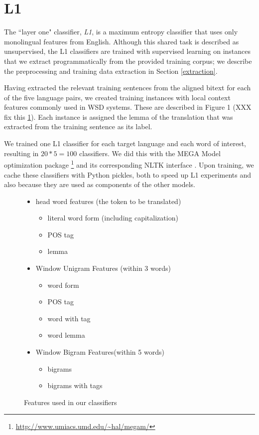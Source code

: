 \documentclass[11pt,letterpaper]{article}
\begin{document}
\section{L1}
The ``layer one" classifier, \emph{L1}, is a maximum entropy classifier that
uses only monolingual features from English. Although this shared task is
described as unsupervised, the L1 classifiers are trained with supervised
learning on instances that we extract programmatically from the provided
training corpus; we describe the preprocessing and training data extraction in
Section \ref{extraction}.

Having extracted the relevant training sentences from the aligned bitext for
each of the five language pairs, we created training instances with local
context features commonly used in WSD systems. These are described in Figure 1
(XXX fix this \ref{fig:features}). Each instance is assigned the lemma of the
translation that was extracted from the training sentence as its
label.

We trained one L1 classifier for each target language and each word of
interest, resulting in $20*5 = 100$ classifiers. We did this with the MEGA
Model optimization package \cite{daume04cg-bfgs}
\footnote{\url{http://www.umiacs.umd.edu/~hal/megam/}} and its corresponding
NLTK interface \cite{nltkbook}. Upon training, we cache these classifiers with
Python pickles, both to speed up L1 experiments and also because they are used
as components of the other models.

\begin{figure}
  \begin{itemize}  %
  
  \item head word features (the token to be translated)
  \begin{itemize}  %
       \item literal word form (including capitalization)
       \item POS tag
       \item lemma
  \end{itemize}
  \item Window Unigram Features (within 3 words)
  \begin{itemize} %
  		\item word form
  		\item POS tag
  		\item word with tag
  		\item word lemma
  \end{itemize}
  \item Window Bigram Features(within 5 words)
  \begin{itemize} %
  		\item bigrams 
  		\item bigrams with tags
  \end{itemize}  
  
  
  \end{itemize}   %
  \label{fig:features}
  \caption{Features used in our classifiers}
\end{figure}
\end{document}
